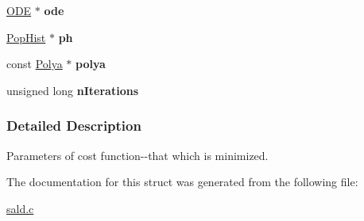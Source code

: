 \begin{DoxyCompactItemize}
\item 
\hypertarget{struct_cost_par_ac7b1e6bd6efc3002a923b7ce7ecff394}{\hyperlink{struct_o_d_e}{\-O\-D\-E} $\ast$ {\bfseries ode}}\label{struct_cost_par_ac7b1e6bd6efc3002a923b7ce7ecff394}

\item 
\hypertarget{struct_cost_par_a5204e90608fc9e6d04c616c5bc837a27}{\hyperlink{struct_pop_hist}{\-Pop\-Hist} $\ast$ {\bfseries ph}}\label{struct_cost_par_a5204e90608fc9e6d04c616c5bc837a27}

\item 
\hypertarget{struct_cost_par_ada1ead2802d07312588c2ea45bf35f61}{const \hyperlink{struct_polya}{\-Polya} $\ast$ {\bfseries polya}}\label{struct_cost_par_ada1ead2802d07312588c2ea45bf35f61}

\item 
\hypertarget{struct_cost_par_a16efa76fb8c04ddf07976b1de0e4ed84}{unsigned long {\bfseries n\-Iterations}}\label{struct_cost_par_a16efa76fb8c04ddf07976b1de0e4ed84}

\end{DoxyCompactItemize}


\subsubsection{\-Detailed \-Description}
\-Parameters of cost function-\/-\/that which is minimized. 



\-The documentation for this struct was generated from the following file\-:\begin{DoxyCompactItemize}
\item 
\hyperlink{sald_8c}{sald.\-c}\end{DoxyCompactItemize}
